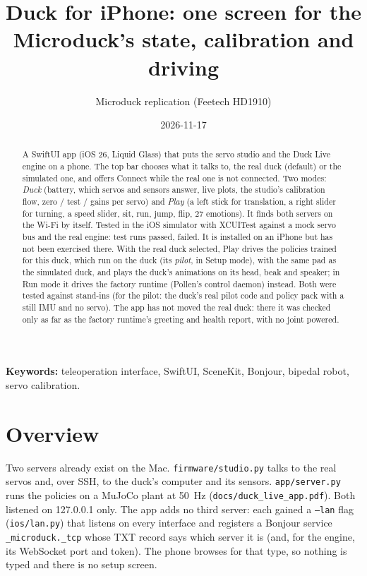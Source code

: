 \documentclass[11pt]{article}
\title{Duck for iPhone: one screen for the Microduck's state, calibration and driving}
\author{Microduck replication (Feetech HD1910)}
\date{2026-11-17}
\begin{document}
\maketitle

\begin{abstract}
A SwiftUI app (iOS 26, Liquid Glass) that puts the servo studio and the Duck Live engine on a phone. The top bar
chooses what it talks to, the real duck (default) or the simulated one, and offers Connect while the real one is
not connected. Two modes: \emph{Duck} (battery, which servos and sensors answer, live plots, the studio's calibration flow, zero / test / gains per servo)
and \emph{Play} (a left stick for translation, a right slider for turning, a speed slider, sit, run, jump, flip, 27
emotions). It finds both servers on the Wi-Fi by itself. Tested in the iOS simulator with XCUITest against a mock
servo bus and the real engine: \iosPassed{} test runs passed, \iosFailed{} failed. It is installed on an iPhone but
has not been exercised there. With the real duck selected, Play drives the policies trained for this duck, which
run on the duck (its \emph{pilot}, in Setup mode), with the same pad as the simulated duck, and plays the duck's
animations on its head, beak and speaker; in Run mode it drives the factory runtime (Pollen's control daemon)
instead. Both were tested against stand-ins (for the pilot: the duck's real pilot code and policy pack with a still
IMU and no servo). The app has not moved the real duck: there it was checked only as far as the factory runtime's
greeting and health report, with no joint powered.
\end{abstract}

\textbf{Keywords:} teleoperation interface, SwiftUI, SceneKit, Bonjour, bipedal robot, servo calibration.

\section{Overview}
Two servers already exist on the Mac. \texttt{firmware/studio.py} talks to the real servos and, over SSH, to the
duck's computer and its sensors. \texttt{app/server.py} runs the policies on a MuJoCo plant at 50~Hz
(\texttt{docs/duck\_live\_app.pdf}). Both listened on 127.0.0.1 only. The app adds no third server: each gained a
\texttt{--lan} flag (\texttt{ios/lan.py}) that listens on every interface and registers a Bonjour service
\texttt{\_microduck.\_tcp} whose TXT record says which server it is (and, for the engine, its WebSocket port and
token). The phone browses for that type, so nothing is typed and there is no setup screen.
\end{document}
